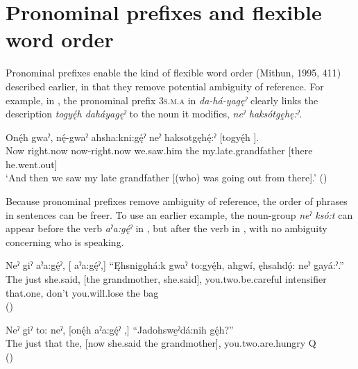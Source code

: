 \section{Pronominal prefixes and flexible word order} \label{ch:Pronominal prefixes and flexible word order}
Pronominal prefixes enable the kind of flexible word order (Mithun, 1995, 411) described earlier, in that they remove potential ambiguity of reference. For example, in , the pronominal prefix  \textsc{3s.m.a} in \textit{da-há-yagęˀ} clearly links the description \textit{togyę́h daháyagęˀ} to the noun it modifies, \textit{neˀ haksótgę̱hę:ˀ}.

\ea\label{ex:whoexsen500} 
\gll Onę́h gwaˀ, nę́-gwaˀ ahsha:kni:gę́ˀ neˀ haksotgęhę́:ˀ [togyę́h ].\\
Now right.now now-right.now we.saw.him the my.late.grandfather [there he.went.out]\\
\glt ‘And then we saw my late grandfather [(who) was going out from there].’ (\cite{henry_de_2005})
\z

Because pronominal prefixes remove ambiguity of reference, the order of phrases in sentences can be freer. To use an earlier example, the noun-group \textit{neˀ ksó:t} can appear before the verb \textit{aˀa:gę́ˀ} in , but after the verb in , with no ambiguity concerning who is speaking.

\ea\label{ex:flexwordexpron}
\gll Neˀ giˀ aˀa:gę́ˀ, [  aˀa:gę́ˀ,] “Ęhsnigǫ̱há:k gwaˀ to:gyę́h, ahgwí, ęhsahdǫ́: neˀ gayá:ˀ.”\\
The just she.said, [the grandmother, she.said], you.two.be.careful intensifier that.one, don’t you.will.lose the bag\\
\glt {} (\cite{henry_de_2005})
\z

\ea\label{ex:flexwordexpron2} 
\gll Neˀ giˀ to: neˀ, [onę́h aˀa:gę́ˀ  ,] “Jadohswe̱ˀdá:nih gę́h?” \\
The just that the, [now she.said the grandmother], you.two.are.hungry Q \\
\glt {} (\cite{henry_de_2005})
\z


